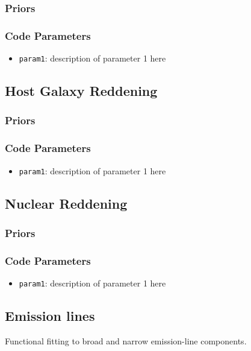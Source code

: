 \documentclass[12pt,letterpaper]{article}
\begin{document}
\subsubsection*{Priors}
\subsubsection*{Code Parameters}

\begin{itemize}
    \item {\tt param1}: description of parameter 1 here
\end{itemize}

\subsection*{Host Galaxy Reddening}

\subsubsection*{Priors}
\subsubsection*{Code Parameters}

\begin{itemize}
    \item {\tt param1}: description of parameter 1 here
\end{itemize}

\subsection*{Nuclear Reddening}

\subsubsection*{Priors}
\subsubsection*{Code Parameters}

\begin{itemize}
    \item {\tt param1}: description of parameter 1 here
\end{itemize}

\subsection*{Emission lines}
Functional fitting to broad and narrow emission-line components.
\end{document}
